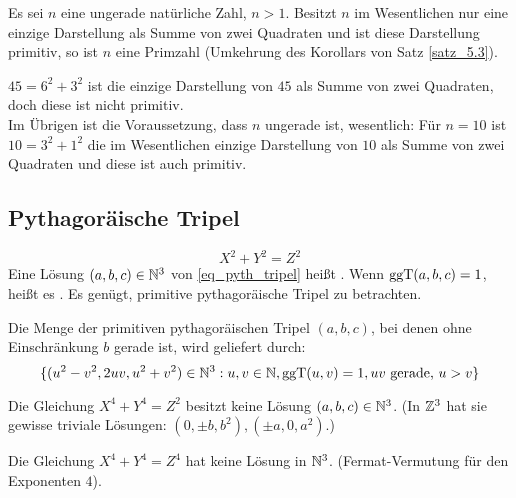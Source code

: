 	Es sei $n$  eine ungerade natürliche Zahl, $n > 1$. Besitzt $n$ im Wesentlichen nur eine einzige Darstellung als Summe von zwei Quadraten und ist diese Darstellung primitiv, so ist $n$ eine Primzahl (Umkehrung des Korollars von Satz \ref{satz_5.3}).
	
	$45 = 6^2 + 3^2$ ist die einzige Darstellung von $45$ als Summe von zwei Quadraten, doch diese ist nicht primitiv. \\
	Im Übrigen ist die Voraussetzung, dass $n$ ungerade ist, wesentlich: Für $n = 10$ ist $10 = 3^2 + 1^2$ die im Wesentlichen einzige Darstellung von $10$ als Summe von zwei Quadraten und diese ist auch primitiv.
\newpage
\subsection{Pythagoräische Tripel}
	\begin{equation}
		X^2 + Y^2 = Z^2 \label{eq_pyth_tripel}
	\end{equation}
	Eine Lösung $(a,b,c) \in \mathbb{N}^3$ von \eqref{eq_pyth_tripel} heißt . Wenn $\operatorname{ggT}(a,b,c) = 1$, heißt es . Es genügt, primitive pythagoräische Tripel zu betrachten.
	
\begin{falko} \label{F5.2}
	Die Menge der primitiven pythagoräischen Tripel $(a,b,c)$, bei denen ohne Einschränkung $b$ gerade ist, wird geliefert durch:
	\begin{equation}
		\{ (u^2-v^2,2uv,u^2+v^2) \in \mathbb{N}^3 : u,v \in \mathbb{N}, \operatorname{ggT}(u,v) = 1, uv \text{ gerade, } u>v \} \label{eq_pyth_tripel2}
	\end{equation}
\end{falko}

\begin{falko}
	Die Gleichung $X^4+Y^4 = Z^2$ besitzt keine Lösung $(a,b,c) \in \mathbb{N}^3$. (In $\mathbb{Z}^3$ hat sie gewisse triviale Lösungen: $(0, \pm b, b^2), (\pm a, 0, a^2)$.)
\end{falko}

	Die Gleichung $X^4+Y^4=Z^4$ hat keine Lösung in $\mathbb{N}^3$. (Fermat-Vermutung für den Exponenten $4$).
	
